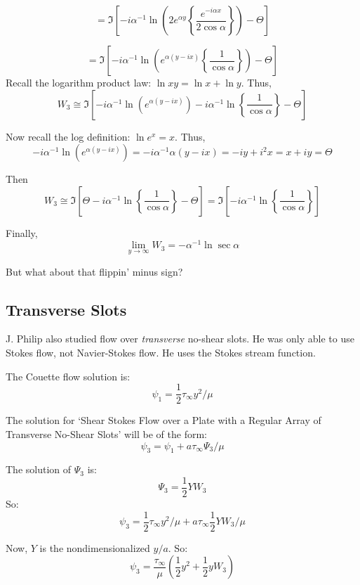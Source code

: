 \documentclass{article}
\begin{document}
\[ = \Im \left[  
 - i \alpha^{-1} \ln \left(
   2 e^{\alpha y} \left\{ \frac{ e^{- i \alpha x}}{2 \cos \alpha} \right\}
    \right)  - \Theta  \right] \]  
    
\[ = \Im \left[  
 - i \alpha^{-1} \ln \left(
   e^{\alpha(y - ix)} \left\{ \frac{1}{ \cos \alpha} \right\}
    \right)  - \Theta  \right] \] 
Recall the logarithm product law: $\ln xy = \ln x + \ln y$.  Thus,
\[ W_{3} \cong \Im \left[  
 - i \alpha^{-1} \ln \left(  e^{\alpha(y - ix)} \right)
 - i \alpha^{-1} \ln  \left\{ \frac{1}{ \cos \alpha} \right\}
     - \Theta  \right] \] 

Now recall the log definition: $\ln e^{x} = x$. Thus,
 \[ - i \alpha^{-1} \ln \left(  e^{\alpha(y - ix)} \right)  =
 - i \alpha^{-1} \alpha (y - ix) = -iy + i^{2}x = x+iy = \Theta \]

Then
\[ W_{3} \cong \Im \left[  
 \Theta
 - i \alpha^{-1} \ln  \left\{ \frac{1}{ \cos \alpha} \right\}
     - \Theta  \right] = \Im \left[  
 - i \alpha^{-1} \ln  \left\{ \frac{1}{ \cos \alpha} \right\} \right] \]
     
Finally,
\[ \lim_{y \rightarrow \infty} W_{3} = - \alpha^{-1} \ln \sec \alpha \] 

\vspace{1em}
But what about that flippin' minus sign?

\pagebreak


\subsection*{Transverse Slots}

J. Philip also studied flow over \emph{transverse} no-shear slots.  He was only able to use Stokes flow, not Navier-Stokes flow.  He uses the Stokes stream function.

The Couette flow solution is:
\[ \psi_{1} = \frac{1}{2} \tau_{\infty} y^{2}/\mu \]

The solution for `Shear Stokes Flow over a Plate with a Regular Array of Transverse No-Shear Slots' will be of the form:
\[ \psi_{3} = \psi_{1} + a \tau_{\infty} \Psi_{3} /\mu\]

The solution of $\Psi_{3}$ is: \[ \Psi_{3} = \frac{1}{2} Y W_{3} \]
So: 
\[ \psi_{3} = \frac{1}{2} \tau_{\infty} y^{2}/\mu
            + a \tau_{\infty} \frac{1}{2} Y W_{3} /\mu  \]            

Now, $Y$ is the nondimensionalized $y/a$. So:
\[ \psi_{3} = \frac{\tau_{\infty}}{\mu} \left( \frac{1}{2} y^{2}
            + \frac{1}{2} y W_{3} \right)  \]      
\end{document}
